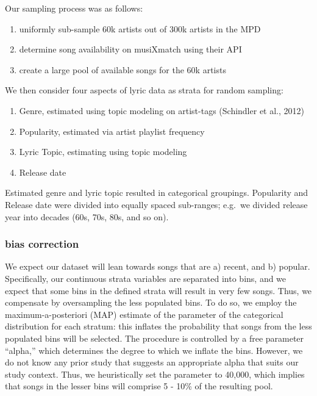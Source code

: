 \documentclass[
  letterpaper,
  DIV=11,
  numbers=noendperiod]{scrartcl}
\providecommand{\tightlist}{%
  \setlength{\itemsep}{0pt}\setlength{\parskip}{0pt}}\usepackage{longtable,booktabs,array}
\begin{document}
Our sampling process was as follows:

\begin{enumerate}
\def\labelenumi{\arabic{enumi}.}
\tightlist
\item
  uniformly sub-sample 60k artists out of 300k artists in the MPD
\item
  determine song availability on musiXmatch using their API
\item
  create a large pool of available songs for the 60k artists
\end{enumerate}

We then consider four aspects of lyric data as strata for random
sampling:

\begin{enumerate}
\def\labelenumi{\arabic{enumi}.}
\tightlist
\item
  Genre, estimated using topic modeling on artist-tags (Schindler et
  al., 2012)
\item
  Popularity, estimated via artist playlist frequency
\item
  Lyric Topic, estimating using topic modeling
\item
  Release date
\end{enumerate}

Estimated genre and lyric topic resulted in categorical groupings.
Popularity and Release date were divided into equally spaced sub-ranges;
e.g.~we divided release year into decades (60s, 70s, 80s, and so on).

\hypertarget{bias-correction}{%
\subsubsection{bias correction}\label{bias-correction}}

We expect our dataset will lean towards songs that are a) recent, and b)
popular. Specifically, our continuous strata variables are separated
into bins, and we expect that some bins in the defined strata will
result in very few songs. Thus, we compensate by oversampling the less
populated bins. To do so, we employ the maximum-a-posteriori (MAP)
estimate of the parameter of the categorical distribution for each
stratum: this inflates the probability that songs from the less
populated bins will be selected. The procedure is controlled by a free
parameter ``alpha,'' which determines the degree to which we inflate the
bins. However, we do not know any prior study that suggests an
appropriate alpha that suits our study context. Thus, we heuristically
set the parameter to 40,000, which implies that songs in the lesser bins
will comprise 5 - 10\% of the resulting pool.
\end{document}
